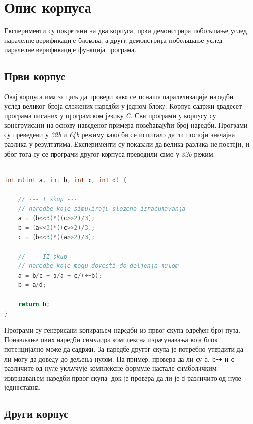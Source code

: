 \documentclass[12pt,oneside]{memoir}
\begin{document}
  \section{Опис корпуса}
  
  Експерименти су покретани на два корпуса, први демонстрира побољшање услед паралелне верификације блокова, а други демонстрира побољшање услед паралелне верификације функција програма.
  \subsection{Први корпус}
  
 Овај корпуса има за циљ да провери како се понаша паралелизације наредби услед великог броја сложених наредби у једном блоку. Корпус садржи двадесет програма писаних у програмском језику \textit{C}. Сви програми у корпусу су конструисани на основу наведеног примера повећавајући број наредби. Програми су преведени у \textit{32b} и \textit{64b} режиму како би се испитало да ли постоји значајна разлика у резултатима. Експерименти су показали да велика разлика не постоји, и због тога су се програми другог корпуса преводили само у \textit{32b} режим. 

  
\begin{lstlisting}[basicstyle=\fontsize{12}{4}\selectfont,language=C,frame=single,caption=Пример програма,label=primer1]

int m(int a, int b, int c, int d) {

	// --- I skup ---
	// naredbe koje simuliraju slozena izracunavanja
	a = (b<<3)*((c>>2)/3);
	b = (a<<3)*((c>>2)/3);
	c = (b<<3)*((a>>2)/3);

	// --- II skup --- 
	// naredbe koje mogu dovesti do deljenja nulom
	a = b/c + b/a + c/(++b);
	b = a/d;
	
	return b;
}
\end{lstlisting}
 Програми су генерисани копирањем наредби из првог скупа одређен број пута. Понављање ових наредби симулира комплексна израчунавања која блок потенцијално може да садржи. За наредбе другог скупа је потребно утврдити да ли могу да доведу до дељења нулом. На пример, провера да ли су \texttt{a}, \texttt{b++} и \texttt{c} различите од нуле укључује комплексне формуле настале симболичким извршавањем наредби првог скупа, док је провера да ли је \texttt{d} различито од нуле једноставна.    


\subsection{Други корпус}
\end{document}
